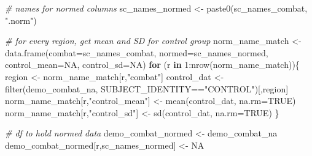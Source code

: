 \documentclass[
]{article}
\newenvironment{Shaded}{\begin{snugshade}}{\end{snugshade}}
\newcommand{\AttributeTok}[1]{\textcolor[rgb]{0.77,0.63,0.00}{#1}}
\newcommand{\CommentTok}[1]{\textcolor[rgb]{0.56,0.35,0.01}{\textit{#1}}}
\newcommand{\ConstantTok}[1]{\textcolor[rgb]{0.00,0.00,0.00}{#1}}
\newcommand{\ControlFlowTok}[1]{\textcolor[rgb]{0.13,0.29,0.53}{\textbf{#1}}}
\newcommand{\DecValTok}[1]{\textcolor[rgb]{0.00,0.00,0.81}{#1}}
\newcommand{\FunctionTok}[1]{\textcolor[rgb]{0.00,0.00,0.00}{#1}}
\newcommand{\NormalTok}[1]{#1}
\newcommand{\OtherTok}[1]{\textcolor[rgb]{0.56,0.35,0.01}{#1}}
\newcommand{\SpecialCharTok}[1]{\textcolor[rgb]{0.00,0.00,0.00}{#1}}
\newcommand{\StringTok}[1]{\textcolor[rgb]{0.31,0.60,0.02}{#1}}
\begin{document}
\begin{Shaded}
\begin{Highlighting}[]
\CommentTok{\# names for normed columns}
\NormalTok{sc\_names\_normed }\OtherTok{\textless{}{-}} \FunctionTok{paste0}\NormalTok{(sc\_names\_combat, }\StringTok{".norm"}\NormalTok{)}

\CommentTok{\# for every region, get mean and SD for control group}
\NormalTok{norm\_name\_match }\OtherTok{\textless{}{-}} \FunctionTok{data.frame}\NormalTok{(}\AttributeTok{combat=}\NormalTok{sc\_names\_combat, }\AttributeTok{normed=}\NormalTok{sc\_names\_normed, }\AttributeTok{control\_mean=}\ConstantTok{NA}\NormalTok{, }\AttributeTok{control\_sd=}\ConstantTok{NA}\NormalTok{)}
\ControlFlowTok{for}\NormalTok{ (r }\ControlFlowTok{in} \DecValTok{1}\SpecialCharTok{:}\FunctionTok{nrow}\NormalTok{(norm\_name\_match))\{}
\NormalTok{  region }\OtherTok{\textless{}{-}}\NormalTok{ norm\_name\_match[r,}\StringTok{"combat"}\NormalTok{]}
\NormalTok{  control\_dat }\OtherTok{\textless{}{-}} \FunctionTok{filter}\NormalTok{(demo\_combat\_na, SUBJECT\_IDENTITY}\SpecialCharTok{==}\StringTok{"CONTROL"}\NormalTok{)[,region]}
\NormalTok{  norm\_name\_match[r,}\StringTok{"control\_mean"}\NormalTok{] }\OtherTok{\textless{}{-}} \FunctionTok{mean}\NormalTok{(control\_dat, }\AttributeTok{na.rm=}\ConstantTok{TRUE}\NormalTok{)}
\NormalTok{  norm\_name\_match[r,}\StringTok{"control\_sd"}\NormalTok{] }\OtherTok{\textless{}{-}} \FunctionTok{sd}\NormalTok{(control\_dat, }\AttributeTok{na.rm=}\ConstantTok{TRUE}\NormalTok{)}
\NormalTok{\}}

\CommentTok{\# df to hold normed data}
\NormalTok{demo\_combat\_normed }\OtherTok{\textless{}{-}}\NormalTok{ demo\_combat\_na}
\NormalTok{demo\_combat\_normed[r,sc\_names\_normed] }\OtherTok{\textless{}{-}} \ConstantTok{NA}


\end{Highlighting}
\end{Shaded}
\end{document}
